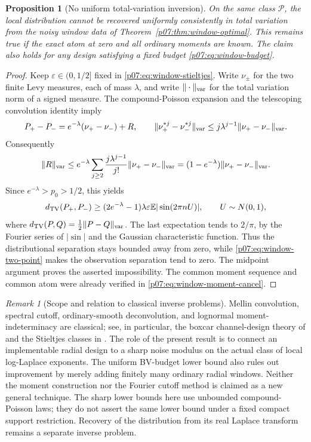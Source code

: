 \documentclass[11pt,letterpaper]{article}
\newtheorem{proposition}[theorem]{Proposition}
\theoremstyle{definition}
\theoremstyle{remark}
\newtheorem{remark}[theorem]{Remark}
\newcommand{\1}{\mathbf 1}
\begin{document}
\begin{proposition}[No uniform total-variation inversion]
\label{p07:prop:window-tv-barrier}
On the same class $\mathcal P$, the local distribution cannot be
recovered uniformly consistently in total variation from the noisy
window data of Theorem~\ref{p07:thm:window-optimal}. This remains true if
the exact atom at zero and all ordinary moments are known. The claim
also holds for any design satisfying a fixed budget
\eqref{p07:eq:window-budget}.
\end{proposition}
\begin{proof}
Keep $\varepsilon\in(0,1/2]$ fixed in
\eqref{p07:eq:window-stieltjes}. Write $\nu_\pm$ for the two finite
Levy measures, each of mass $\lambda$, and write $\|\cdot\|_{\rm var}$
for the total variation norm of a signed measure. The compound-Poisson
expansion and the telescoping convolution identity imply
\[
 P_+-P_-=e^{-\lambda}(\nu_+-\nu_-)+R,
 \qquad
 \|\nu_+^{*j}-\nu_-^{*j}\|_{\rm var}
       \le j\lambda^{j-1}\|\nu_+-\nu_-\|_{\rm var}.
\]
Consequently
\[
 \|R\|_{\rm var}
 \le e^{-\lambda}\sum_{j\ge2}
       \frac{j\lambda^{j-1}}{j!}\|\nu_+-\nu_-\|_{\rm var}
 =(1-e^{-\lambda})\|\nu_+-\nu_-\|_{\rm var}.
\]
Since $e^{-\lambda}>p_0>1/2$, this yields
\[
 d_{\rm TV}(P_+,P_-)
 \ge (2e^{-\lambda}-1)\lambda\varepsilon
                  \mathbb E|\sin(2\pi nU)|,
 \qquad U\sim N(0,1),
\]
where $d_{\rm TV}(P,Q)=\frac12\|P-Q\|_{\rm var}$.
The last expectation tends to $2/\pi$, by the Fourier series of
$|\sin|$ and the Gaussian characteristic function. Thus the
distributional separation stays bounded away from zero, while
\eqref{p07:eq:window-two-point} makes the observation separation tend
to zero. The midpoint argument proves the asserted impossibility.
The common moment sequence and common atom were already verified
in \eqref{p07:eq:window-moment-cancel}.
\end{proof}

\begin{remark}[Scope and relation to classical inverse problems]
Mellin convolution, spectral cutoff, ordinary-smooth
deconvolution, and lognormal moment-indeterminacy are classical;
see, in particular, the boxcar channel-design theory of
\cite{PenskySapatinas2011} and the Stieltjes classes in
\cite{Stoyanov2004,Kleiber2013}.
The role of the present result is to connect an implementable
radial design to a sharp noise modulus on the actual class of
local log-Laplace exponents.  The uniform BV-budget lower bound
also rules out improvement by merely adding finitely many
ordinary radial windows.  Neither the moment construction nor
the Fourier cutoff method is claimed as a new general technique.
The sharp lower bounds here use unbounded compound-Poisson laws;
they do not assert the same lower bound under a fixed compact
support restriction.  Recovery of the distribution from its
real Laplace transform remains a separate inverse problem.
\end{remark}
\end{document}
